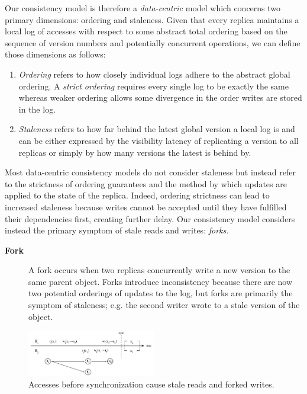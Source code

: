 \documentclass[10pt,conference,letterpaper]{IEEEtran}
\begin{document}
Our consistency model is therefore a \textit{data-centric} model which concerns two primary dimensions: ordering and staleness. Given that every replica maintains a local log of accesses with respect to some abstract total ordering based on the sequence of version numbers and potentially concurrent operations, we can define those dimensions as follows:

\begin{enumerate}
    \item \textit{Ordering} refers to how closely individual logs adhere to the abstract global ordering. A \textit{strict ordering} requires every single log to be exactly the same whereas weaker ordering allows some divergence in the order writes are stored in the log.
    \item \textit{Staleness} refers to how far behind the latest global version a local log is and can be either expressed by the visibility latency of replicating a version to all replicas or simply by how many versions the latest is behind by.
\end{enumerate}

Most data-centric consistency models do not consider staleness but instead refer to the strictness of ordering guarantees and the method by which updates are applied to the state of the replica. Indeed, ordering strictness can lead to increased staleness because writes cannot be accepted until they have fulfilled their dependencies first, creating further delay. Our consistency model considers instead the primary symptom of stale reads and writes: \textit{forks}.

\begin{description}
    \item[\textbf{Fork}] A fork occurs when two replicas concurrently write a new version to the same parent object. Forks introduce inconsistency because there are now two potential orderings of updates to the log, but forks are primarily the symptom of staleness; e.g. the second writer wrote to a stale version of the object.
\end{description}

\begin{figure}[t]
    \centering
    \includegraphics[width=0.5\textwidth]{figures/forks}
    \caption{Accesses before synchronization cause stale reads and forked writes.}
    \label{fig:forks}
\end{figure}
\end{document}
